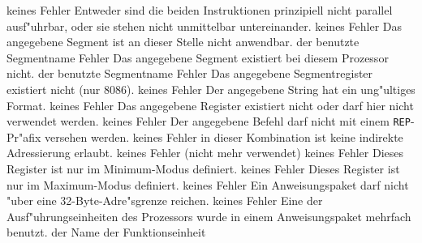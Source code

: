 \documentclass[12pt,a4paper,twoside]{report}
\newcommand{\tty}[1]{{\tt #1}}
\begin{document}
\begin{description}
               {keines}
               {Fehler}
               {Entweder sind die beiden Instruktionen
                prinzipiell nicht parallel ausf"uhrbar, oder sie stehen nicht
                unmittelbar untereinander.}
               {keines}
               {Fehler}
               {Das angegebene Segment ist an dieser Stelle
                nicht anwendbar.}
               {der benutzte Segmentname}
               {Fehler}
               {Das angegebene Segment existiert bei
                diesem Prozessor nicht.}
               {der benutzte Segmentname}
               {Fehler}
               {Das angegebene Segmentregister existiert
                nicht (nur 8086).}
               {keines}
               {Fehler}
               {Der angegebene String hat ein ung"ultiges
                Format.}
               {keines}
               {Fehler}
               {Das angegebene Register existiert nicht oder
                darf hier nicht verwendet werden.}
               {keines}
               {Fehler}
               {Der angegebene Befehl darf nicht mit einem
                \tty{REP}-Pr"afix versehen werden.}
               {keines}
               {Fehler}
               {in dieser Kombination ist keine indirekte
                Adressierung erlaubt.}
               {keines}
               {Fehler}
               {(nicht mehr verwendet)}
               {keines}
               {Fehler}
               {Dieses Register ist nur im Minimum-Modus
                definiert.}
               {keines}
               {Fehler}
               {Dieses Register ist nur im Maximum-Modus
                definiert.}
               {keines}
               {Fehler}
               {Ein Anweisungspaket darf nicht "uber eine
                32-Byte-Adre"sgrenze reichen.}
               {keines}
               {Fehler}
               {Eine der Ausf"uhrungseinheiten des Prozessors wurde in
                einem Anweisungspaket mehrfach benutzt.}
               {der Name der Funktionseinheit}

\end{description}
\end{document}
